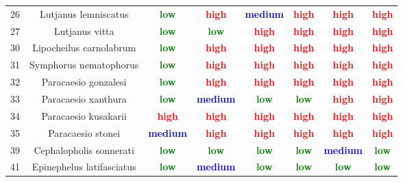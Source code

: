 \documentclass{report}\usepackage[]{graphicx}\usepackage[]{color}
\begin{document}
\begin{table}[ht]
{\begin{tabular}{cccccccc}
   26 & Lutjanus lemniscatus & \textcolor{green}{\textbf{low}} & \textcolor{red}{\textbf{high}} & \textcolor{blue}{\textbf{medium}} & \textcolor{red}{\textbf{high}} & \textcolor{red}{\textbf{high}} & \textcolor{red}{\textbf{high}} \\ 
   27 & Lutjanus vitta & \textcolor{green}{\textbf{low}} & \textcolor{green}{\textbf{low}} & \textcolor{red}{\textbf{high}} & \textcolor{red}{\textbf{high}} & \textcolor{red}{\textbf{high}} & \textcolor{red}{\textbf{high}} \\ 
   30 & Lipocheilus carnolabrum & \textcolor{green}{\textbf{low}} & \textcolor{red}{\textbf{high}} & \textcolor{red}{\textbf{high}} & \textcolor{red}{\textbf{high}} & \textcolor{red}{\textbf{high}} & \textcolor{red}{\textbf{high}} \\ 
   31 & Symphorus nematophorus & \textcolor{green}{\textbf{low}} & \textcolor{red}{\textbf{high}} & \textcolor{red}{\textbf{high}} & \textcolor{red}{\textbf{high}} & \textcolor{red}{\textbf{high}} & \textcolor{red}{\textbf{high}} \\ 
   32 & Paracaesio gonzalesi & \textcolor{green}{\textbf{low}} & \textcolor{red}{\textbf{high}} & \textcolor{red}{\textbf{high}} & \textcolor{red}{\textbf{high}} & \textcolor{red}{\textbf{high}} & \textcolor{red}{\textbf{high}} \\ 
   33 & Paracaesio xanthura & \textcolor{green}{\textbf{low}} & \textcolor{blue}{\textbf{medium}} & \textcolor{green}{\textbf{low}} & \textcolor{green}{\textbf{low}} & \textcolor{red}{\textbf{high}} & \textcolor{red}{\textbf{high}} \\ 
   34 & Paracaesio kusakarii & \textcolor{red}{\textbf{high}} & \textcolor{red}{\textbf{high}} & \textcolor{red}{\textbf{high}} & \textcolor{red}{\textbf{high}} & \textcolor{red}{\textbf{high}} & \textcolor{red}{\textbf{high}} \\ 
   35 & Paracaesio stonei & \textcolor{blue}{\textbf{medium}} & \textcolor{red}{\textbf{high}} & \textcolor{red}{\textbf{high}} & \textcolor{red}{\textbf{high}} & \textcolor{red}{\textbf{high}} & \textcolor{red}{\textbf{high}} \\ 
   39 & Cephalopholis sonnerati & \textcolor{green}{\textbf{low}} & \textcolor{green}{\textbf{low}} & \textcolor{green}{\textbf{low}} & \textcolor{green}{\textbf{low}} & \textcolor{blue}{\textbf{medium}} & \textcolor{green}{\textbf{low}} \\ 
   41 & Epinephelus latifasciatus & \textcolor{green}{\textbf{low}} & \textcolor{blue}{\textbf{medium}} & \textcolor{green}{\textbf{low}} & \textcolor{green}{\textbf{low}} & \textcolor{green}{\textbf{low}} & \textcolor{green}{\textbf{low}} \\ 

\end{tabular}}
\end{table}
\end{document}
